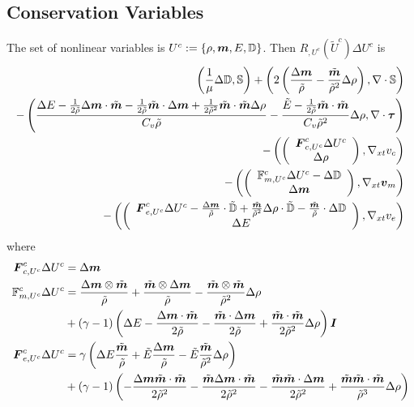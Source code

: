 \documentclass{article}
\begin{document}
\subsection*{Conservation Variables}
The set of nonlinear variables is $U^c:=\left\{ \rho,\boldsymbol m,E,\mathbb{D} \right\}$.
Then $R_{,U^c}(\tilde U^c)\Delta U^c$ is
\begin{align*}
	\left( \frac{1}{\mu}\Delta\mathbb{D},\mathbb{S} \right)+\left( 2\left( \frac{\Delta\boldsymbol m}{\tilde\rho}-\frac{\tilde{\boldsymbol m}}{\tilde\rho^2}\Delta\rho \right),\nabla\cdot\mathbb{S} \right)\\
	-\left( \frac{\Delta E-\frac{1}{2\tilde\rho}\Delta\boldsymbol m\cdot\tilde{\boldsymbol m}-\frac{1}{2\tilde\rho}\tilde{\boldsymbol m}\cdot\Delta\boldsymbol m
	+\frac{1}{2\tilde\rho^2}\tilde{\boldsymbol m}\cdot\tilde{\boldsymbol m}\Delta\rho}{C_v\tilde\rho}
	-\frac{\tilde E-\frac{1}{2\tilde\rho}\tilde{\boldsymbol m}\cdot\tilde{\boldsymbol m}}{C_v\tilde\rho^2}\Delta\rho,\nabla\cdot\boldsymbol\tau \right)\\
	-\left( \left( \begin{array}{c} \boldsymbol F^c_{c,U^c}\Delta U^c\\ \Delta\rho\\ \end{array} \right),\nabla_{xt} v_c \right)\\
	-\left( \left( \begin{array}{c} \mathbb{F}^c_{m,U^c}\Delta U^c-\Delta\mathbb{D}\\ \Delta\boldsymbol m\\ \end{array} \right),\nabla_{xt}\boldsymbol v_m \right)\\
	-\left( \left( \begin{array}{c} \boldsymbol F^c_{e,U^c}\Delta U^c-\frac{\Delta\boldsymbol m}{\tilde\rho}\cdot\tilde{\mathbb{D}}
	+\frac{\tilde{\boldsymbol m}}{\tilde\rho^2}\Delta\rho\cdot\tilde{\mathbb{D}}-\frac{\tilde{\boldsymbol m}}{\tilde\rho}\cdot\Delta\mathbb{D}\\ \Delta E\\ \end{array} \right),\nabla_{xt} v_e \right)
\end{align*}
where
\begin{align*}
\boldsymbol F^c_{c,U^c}\Delta U^c&=\Delta\boldsymbol m\\
\mathbb{F}^c_{m,U^c}\Delta U^c&=
\frac{\Delta\boldsymbol m\otimes\tilde{\boldsymbol m}}{\tilde\rho}
+\frac{\tilde{\boldsymbol m}\otimes\Delta\boldsymbol m}{\tilde\rho}
-\frac{\tilde{\boldsymbol m}\otimes\tilde{\boldsymbol m}}{\tilde\rho^2}\Delta\rho\\
&+(\gamma-1)\left( \Delta E
-\frac{\Delta\boldsymbol m\cdot\tilde{\boldsymbol m}}{2\tilde\rho}
-\frac{\tilde{\boldsymbol m}\cdot\Delta\boldsymbol m}{2\tilde\rho}
+\frac{\tilde{\boldsymbol m}\cdot\tilde{\boldsymbol m}}{2\tilde\rho^2}\Delta\rho
 \right)\boldsymbol I\\
\boldsymbol F^c_{e,U^c}\Delta U^c&=
\gamma\left( 
\Delta E\frac{\tilde{\boldsymbol m}}{\tilde\rho}
+\tilde E\frac{\Delta\boldsymbol m}{\tilde\rho}
-\tilde E\frac{\tilde{\boldsymbol m}}{\tilde\rho^2}\Delta\rho \right)\\
&+(\gamma-1)\left( 
-\frac{\Delta\boldsymbol m\tilde{\boldsymbol m}\cdot\tilde{\boldsymbol m}}{2\tilde\rho^2}
-\frac{\tilde{\boldsymbol m}\Delta\boldsymbol m\cdot\tilde{\boldsymbol m}}{2\tilde\rho^2}
-\frac{\tilde{\boldsymbol m}\tilde{\boldsymbol m}\cdot\Delta\boldsymbol m}{2\tilde\rho^2}
+\frac{\tilde{\boldsymbol m}\tilde{\boldsymbol m}\cdot\tilde{\boldsymbol m}}{\tilde\rho^3}\Delta\rho
 \right)\\
\end{align*}
\end{document}
